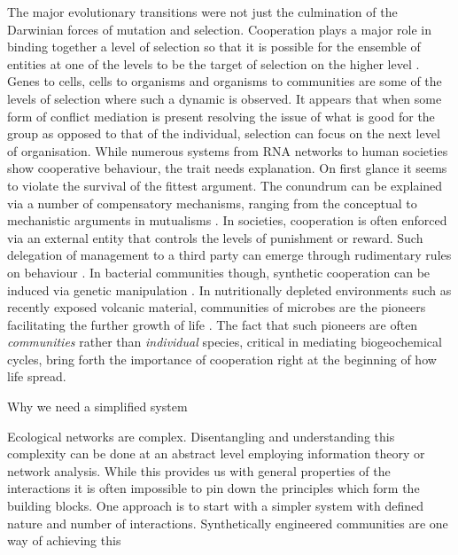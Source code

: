 The major evolutionary transitions were not just the culmination of the Darwinian forces of mutation and selection. 
Cooperation plays a major role in binding together a level of selection so that it is possible for the ensemble of entities at one of the levels to be the target of selection on the higher level \citep{maynard-smith:book:1995a}.
Genes to cells, cells to organisms and organisms to communities are some of the levels of selection where such a dynamic is observed.
It appears that when some form of conflict mediation is present resolving the issue of what is good for the group as opposed to that of the individual, selection can focus on the next level of organisation.
While numerous systems from RNA networks to human societies show cooperative behaviour, the trait needs explanation.
On first glance it seems to violate the survival of the fittest argument.
The conundrum can be explained via a number of compensatory mechanisms, ranging from the conceptual \citep{nowak:Science:2006} to mechanistic arguments in mutualisms \citep{akcay:bookchapter:2015}.
In societies, cooperation is often enforced via an external entity that controls the levels of punishment or reward. 
Such delegation of management to a third party can emerge through rudimentary rules on behaviour \citep{sigmund:Nature:2010}.
In bacterial communities though, synthetic cooperation can be induced via genetic manipulation \citep{shou:elife:2015,campbell:elife:2015}.
In nutritionally depleted environments such as recently exposed volcanic material, communities of microbes are the pioneers facilitating the further growth of life \citep{kelly:MicEco:2014,fujimura:SciRep:2016}.
The fact that such pioneers are often \textit{communities} rather than \textit{individual} species,  critical in mediating biogeochemical cycles, bring forth the importance of cooperation right at the beginning of how life spread.

Why we need a simplified system

Ecological networks are complex.
Disentangling and understanding this complexity can be done at an abstract level employing information theory or network analysis.
While this provides us with general properties of the interactions it is often impossible to pin down the principles which form the building blocks.
One approach is to start with a simpler system with defined nature and number of interactions.
Synthetically engineered communities are one way of achieving this \citep{momeni:elife:2013}
